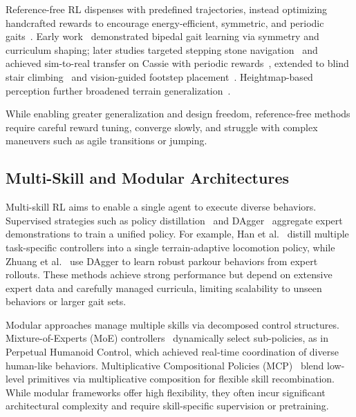 \documentclass[letterpaper, 10 pt, conference]{ieeeconf}
\begin{document}
Reference-free RL dispenses with predefined trajectories, instead optimizing handcrafted rewards to encourage energy-efficient, symmetric, and periodic gaits~\cite{2023_vanmarum_visionDRL_studentteacher_irregularterrain_PPO_periodicrewardfunction}. Early work~\cite{2018_wenhao_yu_DRL_withoutpredefine_symmetrygait_PPO_jointanglePD_} demonstrated bipedal gait learning via symmetry and curriculum shaping; later studies targeted stepping stone navigation~\cite{2020_zhaoming_drl_steppingstones_PPOwithactorcritic_referencefree_simulation} and achieved sim-to-real transfer on Cassie with periodic rewards~\cite{2021_siekmann_sim2real_nonreference_perodicreward_DRL_e2e_LSTM_PPO_cassie}, extended to blind stair climbing~\cite{2021_siekmann_blind_DRL_stair} and vision-guided footstep placement~\cite{2022_sim2real_footstepconstraint_OSUDRL_specifytouchdownlocation_actorcritic_PPO_LSTM_plannar_transisionmodel_model-predictiveplanning_CNN_predictnexttdlocation,2022_OSUDRL_steppingstone_referencefree_predictionfeasiblefootsteps_camera_benchmark}. Heightmap-based perception further broadened terrain generalization~\cite{2023_duan_OSUDRL_heightmap_visionbased_hybrid}.  

While enabling greater generalization and design freedom, reference-free methods require careful reward tuning, converge slowly, and struggle with complex maneuvers such as agile transitions or jumping.

\subsection{Multi-Skill and Modular Architectures}

Multi-skill RL aims to enable a single agent to execute diverse behaviors.  
Supervised strategies such as policy distillation~\cite{rusu2015policy} and DAgger~\cite{ross2011reduction} aggregate expert demonstrations to train a unified policy.  
For example, Han et al.~\cite{han2024lifelike} distill multiple task-specific controllers into a single terrain-adaptive locomotion policy, while Zhuang et al.~\cite{zhuang2023robot} use DAgger to learn robust parkour behaviors from expert rollouts.  
These methods achieve strong performance but depend on extensive expert data and carefully managed curricula, limiting scalability to unseen behaviors or larger gait sets.

Modular approaches manage multiple skills via decomposed control structures.  
Mixture-of-Experts (MoE) controllers~\cite{luo2023perpetual} dynamically select sub-policies, as in Perpetual Humanoid Control, which achieved real-time coordination of diverse human-like behaviors.  
Multiplicative Compositional Policies (MCP)~\cite{peng2019mcp} blend low-level primitives via multiplicative composition for flexible skill recombination.  
While modular frameworks offer high flexibility, they often incur significant architectural complexity and require skill-specific supervision or pretraining.
\end{document}
